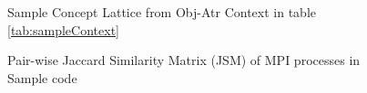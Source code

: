 \begin{figure}[t]
\centering
{}
\caption{Sample Concept Lattice from Obj-Atr Context in table \ref{tab:sampleContext}}
\label{fig:sampleCL}
\end{figure}



\begin{figure}[]
\centering
{}
\caption{Pair-wise Jaccard Similarity Matrix (JSM) of MPI processes in Sample code}
\label{fig:jsm2}
\end{figure}

